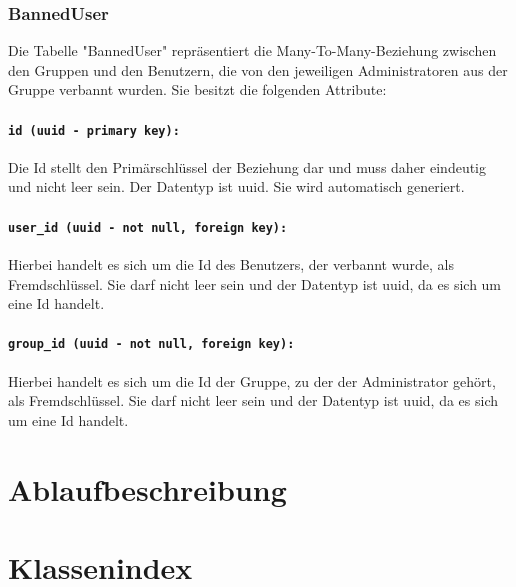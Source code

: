 \documentclass{entwurfsheft}
\begin{document}
\subsubsection{BannedUser}
Die Tabelle "BannedUser" repräsentiert die Many-To-Many-Beziehung zwischen den Gruppen und den Benutzern, die von den jeweiligen Administratoren aus der Gruppe verbannt wurden. Sie besitzt die folgenden Attribute:
\paragraph{\texttt{id (uuid - primary key):}} Die Id stellt den Primärschlüssel der Beziehung dar und muss daher eindeutig und nicht leer sein. Der Datentyp ist \Gls{uuid}. Sie wird automatisch generiert.
\paragraph{\texttt{user\_id (uuid - not null, foreign key):}} Hierbei handelt es sich um die Id des Benutzers, der verbannt wurde, als Fremdschlüssel. Sie darf nicht leer sein und der Datentyp ist \Gls{uuid}, da es sich um eine Id handelt.
\paragraph{\texttt{group\_id (uuid - not null, foreign key):}} Hierbei handelt es sich um die Id der Gruppe, zu der der Administrator gehört, als Fremdschlüssel. Sie darf nicht leer sein und der Datentyp ist \Gls{uuid}, da es sich um eine Id handelt.
\newpage

\section{Ablaufbeschreibung}

\newpage
\section{Klassenindex}
\end{document}
